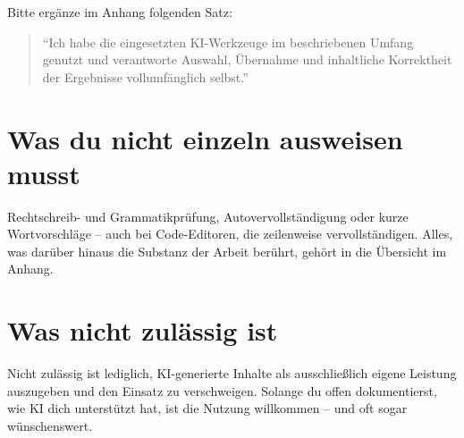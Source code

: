 Bitte ergänze im Anhang folgenden Satz:

\begin{quote}
\enquote{Ich habe die eingesetzten KI-Werkzeuge im beschriebenen Umfang genutzt und verantworte Auswahl, Übernahme und inhaltliche Korrektheit der Ergebnisse vollumfänglich selbst.}
\end{quote}

\section{Was du nicht einzeln ausweisen musst}

Rechtschreib- und Grammatikprüfung, Autovervollständigung oder kurze Wortvorschläge -- auch bei Code-Editoren, die zeilenweise vervollständigen. Alles, was darüber hinaus die Substanz der Arbeit berührt, gehört in die Übersicht im Anhang.

\section{Was nicht zulässig ist}

Nicht zulässig ist lediglich, KI-generierte Inhalte als ausschließlich eigene Leistung auszugeben und den Einsatz zu verschweigen. Solange du offen dokumentierst, wie KI dich unterstützt hat, ist die Nutzung willkommen -- und oft sogar wünschenswert.

